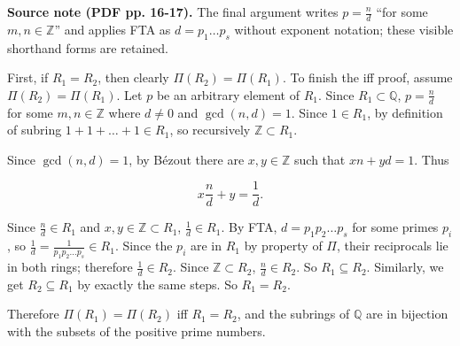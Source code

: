 {\textbf{Source note (PDF pp. 16-17).} The final argument writes \(p = \frac{n}{d}\) ``for some \(m,n \in \mathbb{Z}\)'' and applies FTA as \(d = p_{1}\ldots p_{s}\) without exponent notation; these visible shorthand forms are retained.}

First, if \(R_{1} = R_{2}\), then clearly \(\Pi\left( R_{2} \right) = \Pi\left( R_{1} \right)\). To finish the iff proof, assume \(\Pi\left( R_{2} \right) = \Pi\left( R_{1} \right)\). Let \(p\) be an arbitrary element of \(R_{1}\). Since \(R_{1} \subset \mathbb{Q}\), \(p = \frac{n}{d}\) for some \(m,n \in \mathbb{Z}\) where \(d \neq 0\) and \(\gcd\left( {n,d} \right) = 1\). Since \(1 \in R_{1}\), by definition of subring \(1 + 1 + \ldots + 1 \in R_{1}\), so recursively \(\mathbb{Z} \subset R_{1}\).

Since \(\gcd\left( {n,d} \right) = 1\), by Bézout there are \(x,y \in \mathbb{Z}\) such that \(xn + yd = 1\). Thus

\[x\frac{n}{d} + y = \frac{1}{d}.\]

Since \(\frac{n}{d} \in R_{1}\) and \(x,y \in \mathbb{Z} \subset R_{1}\), \(\frac{1}{d} \in R_{1}\). By FTA, \(d = p_{1}p_{2}\ldots p_{s}\) for some primes \(p_{i}\), so \(\frac{1}{d} = \frac{1}{p_{1}p_{2}\ldots p_{s}} \in R_{1}\). Since the \(p_{i}\) are in \(R_{1}\) by property of \(\Pi\), their reciprocals lie in both rings; therefore \(\frac{1}{d} \in R_{2}\). Since \(\mathbb{Z} \subset R_{2}\), \(\frac{n}{d} \in R_{2}\). So \(R_{1} \subseteq R_{2}\). Similarly, we get \(R_{2} \subseteq R_{1}\) by exactly the same steps. So \(R_{1} = R_{2}\).

Therefore \(\Pi\left( R_{1} \right) = \Pi\left( R_{2} \right)\) iff \(R_{1} = R_{2}\), and the subrings of \(\mathbb{Q}\) are in bijection with the subsets of the positive prime numbers.
